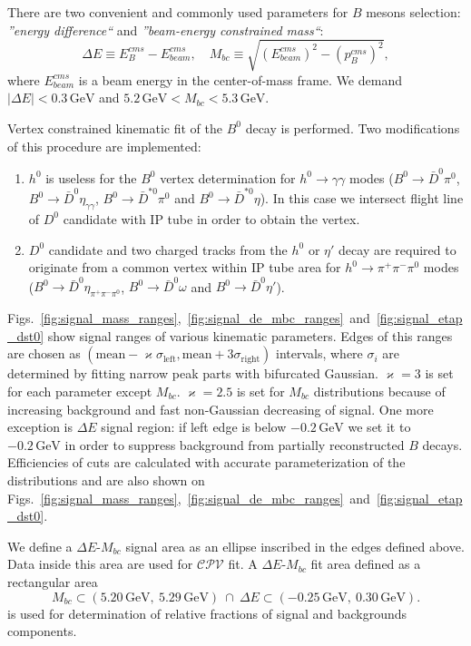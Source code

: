 \documentclass[preprint,aps,showpacs]{revtex4}
\newcommand{\cpvconj}{\ensuremath{\mathcal{CPV}}\xspace}
\newcommand{\bdpi}{\ensuremath{B^0\to \bar D^0\pi^0}\xspace}
\newcommand{\bdetagg}{\ensuremath{B^0\to \bar D^0\eta_{\gamma\gamma}}\xspace}
\newcommand{\bdetap}{\ensuremath{B^0\to \bar D^0\eta\prime}\xspace}
\newcommand{\bdetappp}{\ensuremath{B^0\to \bar D^0\eta_{\pi^+\pi^-\pi^0}}\xspace}
\newcommand{\bdomega}{\ensuremath{B^0\to \bar D^0\omega}\xspace}
\newcommand{\btodstpi}{\ensuremath{B^0\to \bar D^{*0}\pi^0}\xspace}
\newcommand{\btodsteta}{\ensuremath{B^0\to \bar D^{*0}\eta}\xspace}
\newcommand{\de}{\ensuremath{\Delta E}\xspace}
\newcommand{\mbc}{\ensuremath{M_{bc}}\xspace}
\begin{document}
There are two convenient and commonly used parameters for $B$ mesons selection: {\it ''energy difference``} and {\it ''beam-energy constrained mass``}:
\begin{equation}\label{eq:de-mbc-definition}
 \de \equiv E^{cms}_{B}-E^{cms}_{beam},\quad
 \mbc \equiv \sqrt{\left(E^{cms}_{beam}\right)^2-\left(p^{cms}_{B}\right)^2},
\end{equation}
where $E^{cms}_{beam}$ is a beam energy in the center-of-mass frame. We demand $\left|\Delta E\right|<0.3\,\text{GeV}$ and $5.2\,\text{GeV}<M_{bc}<5.3\,\text{GeV}$.

Vertex constrained kinematic fit of the $B^0$ decay is performed. Two modifications of this procedure are implemented:
\begin{enumerate}
 \item $h^0$ is useless for the $B^0$ vertex determination for $h^0\to\gamma\gamma$ modes (\bdpi, \bdetagg, \btodstpi and \btodsteta). In this case we intersect flight line of $D^0$ candidate with IP tube in order to obtain the vertex.
 \item $D^0$ candidate and two charged tracks from the $h^0$ or $\eta\prime$ decay are required to originate from a common vertex within IP tube area for $h^0\to\pi^+\pi^-\pi^0$ modes (\bdetappp, \bdomega and \bdetap).%
\end{enumerate}

Figs.~\ref{fig:signal_mass_ranges},~\ref{fig:signal_de_mbc_ranges}~and~\ref{fig:signal_etap_dst0} show signal ranges of various kinematic parameters. Edges of this ranges are chosen as $(\text{mean}-\varkappa\sigma_{\text{left}},\text{mean}+3\sigma_{\text{right}})$ intervals, where $\sigma_{i}$ are determined by fitting narrow peak parts with bifurcated Gaussian. $\varkappa=3$ is set for each parameter except \mbc. $\varkappa=2.5$ is set for \mbc distributions because of increasing background and fast non-Gaussian decreasing of signal. One more exception is \de signal region: if left edge is below $-0.2\,\text{GeV}$ we set it to $-0.2\,\text{GeV}$ in order to suppress background from partially reconstructed $B$ decays. Efficiencies of cuts are calculated with accurate parameterization of the distributions and are also shown on Figs.~\ref{fig:signal_mass_ranges},~\ref{fig:signal_de_mbc_ranges}~and~\ref{fig:signal_etap_dst0}.

We define a \de-\mbc signal area as an ellipse inscribed in the edges defined above. Data inside this area are used for \cpvconj fit. A \de-\mbc fit area defined as a rectangular area
\begin{equation}\label{eq:de-mbc-fit-area}
 \mbc \subset \left(5.20\,\text{GeV},\ 5.29\,\text{GeV}\right)\ \cap\ \de \subset \left(-0.25\,\text{GeV},\ 0.30\,\text{GeV}\right).
\end{equation}
is used for determination of relative fractions of signal and backgrounds components.
\end{document}
